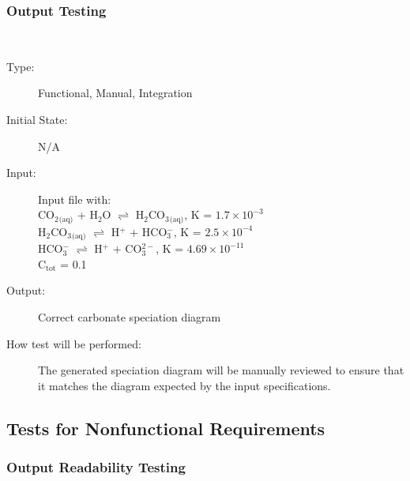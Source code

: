 \documentclass[12pt, titlepage]{article}
\newcounter{testnum} %
\begin{document}
\subsubsection{Output Testing}

\begin{addmargin}[2em]{0em}
\\
\begin{addmargin}[2em]{0em}
\begin{description}
\item[Type:] Functional, Manual, Integration
					
\item[Initial State:] N/A
					
\item[Input:] Input file with:\\
CO$_2$$_\text{(aq)}$ + H$_2$O $\rightleftharpoons$ H$_2$CO$_3$$_\text{(aq)}$, 
  K = $1.7\times10^{−3}$\\
H$_2$CO$_3$$_\text{(aq)}$ $\rightleftharpoons$ H$^+$ + HCO$_3^-$, 
  K = $2.5\times10^{−4}$\\
HCO$_3^-$ $\rightleftharpoons$ H$^+$ + CO$_3^{2-}$, K = $4.69\times10^{−11}$\\
C$_{\text{tot}}$ = 0.1\\
					
\item[Output:] Correct carbonate speciation diagram\\
					
\item[How test will be performed:] The generated speciation diagram will be 
manually reviewed to ensure that it matches the diagram expected by the input 
specifications.\\
\end{description}
\end{addmargin}
\end{addmargin}


\subsection{Tests for Nonfunctional Requirements}

\subsubsection{Output Readability Testing}
		
\end{document}
